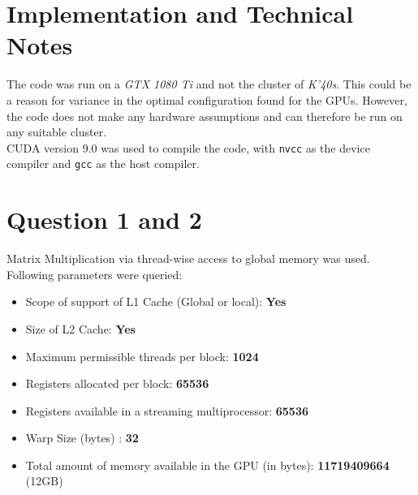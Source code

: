 \section {Implementation and Technical Notes}

The code was run on a \textit{GTX 1080 Ti} and not the cluster of \textit{K'40s}. This could be a reason for variance in the optimal configuration found for the GPUs. However, the code does not make any hardware assumptions and can therefore be run on any suitable cluster. \\

CUDA version 9.0 was used to compile the code, with \lstinline{nvcc} as the device compiler and \lstinline{gcc} as the host compiler.

\section {Question 1 and 2}

Matrix Multiplication via thread-wise access to global memory was used.\\

Following parameters were queried:
\begin{itemize}
\item Scope of support of L1 Cache (Global or local): \quad \textbf{Yes}
\item Size of L2 Cache: \quad \textbf{Yes}
\item Maximum permissible threads per block: \quad \textbf{1024}
\item Registers allocated per block: \quad \textbf{65536}
\item Registers available in a streaming multiprocessor: \quad \textbf{65536}
\item Warp Size (bytes) : \quad \textbf{32}
\item Total amount of memory available in the GPU (in bytes): \quad \textbf{11719409664} (12GB)
\end{itemize}


